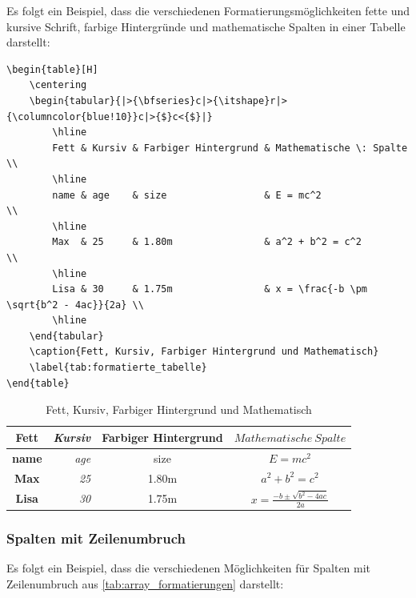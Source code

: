 Es folgt ein Beispiel, dass die verschiedenen Formatierungsmöglichkeiten fette und kursive Schrift, farbige Hintergründe und mathematische Spalten in einer Tabelle darstellt:

\begin{lstlisting}[language={[LaTeX]TeX}, basicstyle=\footnotesize]
\begin{table}[H]
    \centering
    \begin{tabular}{|>{\bfseries}c|>{\itshape}r|>{\columncolor{blue!10}}c|>{$}c<{$}|}
        \hline
        Fett & Kursiv & Farbiger Hintergrund & Mathematische \: Spalte                \\
        \hline
        name & age    & size                 & E = mc^2                               \\
        \hline
        Max  & 25     & 1.80m                & a^2 + b^2 = c^2                        \\
        \hline
        Lisa & 30     & 1.75m                & x = \frac{-b \pm \sqrt{b^2 - 4ac}}{2a} \\
        \hline
    \end{tabular}
    \caption{Fett, Kursiv, Farbiger Hintergrund und Mathematisch}
    \label{tab:formatierte_tabelle}
\end{table}
\end{lstlisting}

\begin{table}[H]
    \centering
    \begin{tabular}{|>{\bfseries}c|>{\itshape}r|>{\columncolor{blue!10}}c|>{$}c<{$}|}
        \hline
        Fett & Kursiv & Farbiger Hintergrund & Mathematische \: Spalte                \\
        \hline
        name & age    & size                 & E = mc^2                               \\
        \hline
        Max  & 25     & 1.80m                & a^2 + b^2 = c^2                        \\
        \hline
        Lisa & 30     & 1.75m                & x = \frac{-b \pm \sqrt{b^2 - 4ac}}{2a} \\
        \hline
    \end{tabular}
    \caption{Fett, Kursiv, Farbiger Hintergrund und Mathematisch}
    \label{tab:formatierte_tabelle}
\end{table}

\subsubsection{Spalten mit Zeilenumbruch}
Es folgt ein Beispiel, dass die verschiedenen Möglichkeiten für Spalten mit Zeilenumbruch aus \autoref{tab:array_formatierungen} darstellt:

